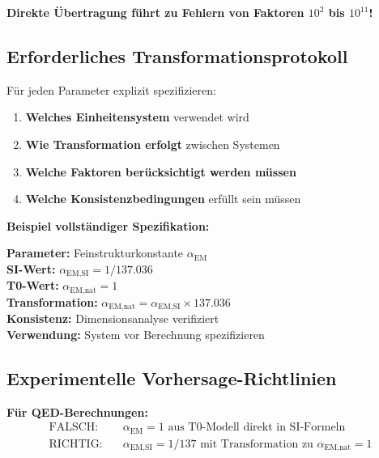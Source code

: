 \documentclass[12pt,a4paper]{article}
\newcommand{\alphaEMSI}{\alpha_{\text{EM,SI}}}
\newcommand{\alphaEMnat}{\alpha_{\text{EM,nat}}}
\begin{document}
	\textbf{Direkte Übertragung führt zu Fehlern von Faktoren $10^2$ bis $10^{11}$!}
	
	\subsection{Erforderliches Transformationsprotokoll}
	\label{subsec:transformationsprotokoll}
	
	Für jeden Parameter explizit spezifizieren:
	
	\begin{enumerate}
		\item \textbf{Welches Einheitensystem} verwendet wird
		\item \textbf{Wie Transformation erfolgt} zwischen Systemen
		\item \textbf{Welche Faktoren berücksichtigt werden müssen}
		\item \textbf{Welche Konsistenzbedingungen} erfüllt sein müssen
	\end{enumerate}
	
	\textbf{Beispiel vollständiger Spezifikation:}
	\begin{tcolorbox}[colback=red!5!white,colframe=red!75!black,title=Parameter-Spezifikationsvorlage]
		\textbf{Parameter:} Feinstrukturkonstante $\alpha_{\text{EM}}$ \\
		\textbf{SI-Wert:} $\alphaEMSI = 1/137.036$ \\
		\textbf{T0-Wert:} $\alphaEMnat = 1$ \\
		\textbf{Transformation:} $\alphaEMnat = \alphaEMSI \times 137.036$ \\
		\textbf{Konsistenz:} Dimensionsanalyse verifiziert \\
		\textbf{Verwendung:} System vor Berechnung spezifizieren
	\end{tcolorbox}
	
	\subsection{Experimentelle Vorhersage-Richtlinien}
	\label{subsec:experimentelle_richtlinien}
	
	\textbf{Für QED-Berechnungen:}
	\begin{align}
		\text{FALSCH:} \quad &\alpha_{\text{EM}} = 1 \text{ aus T0-Modell direkt in SI-Formeln} \\
		\text{RICHTIG:} \quad &\alphaEMSI = 1/137 \text{ mit Transformation zu } \alphaEMnat = 1
	\end{align}
	
\end{document}
